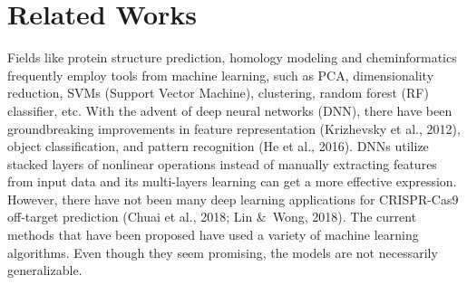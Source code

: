 \documentclass[journal]{IEEEtran}
\begin{document}
\section*{Related Works}
Fields like protein structure prediction, homology modeling and cheminformatics frequently employ tools from machine learning, such as PCA, dimensionality reduction, SVMs (Support Vector Machine), clustering, random forest (RF) classifier, etc. With the advent of deep neural networks (DNN), there have been groundbreaking improvements in feature representation (Krizhevsky et al., 2012), object classification, and pattern recognition (He et al., 2016). DNNs utilize stacked layers of nonlinear operations instead of manually extracting features from input data and its multi-layers learning can get a more effective expression. However, there have not been many deep learning applications for CRISPR-Cas9 off-target prediction (Chuai et al., 2018; Lin \&\ Wong, 2018). The current methods that have been proposed have used a variety of machine learning algorithms. Even though they seem promising, the models are not necessarily generalizable.
\end{document}

